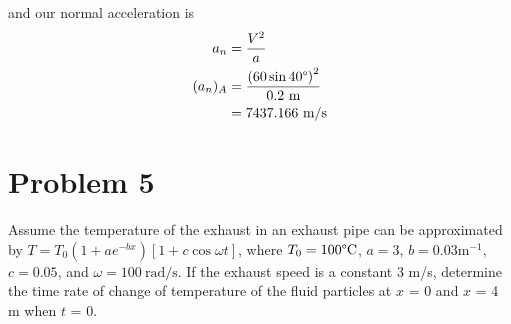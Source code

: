 \documentclass{article}
\begin{document}
and our normal acceleration is
\begin{align*}
    a_n &= \frac{V^2}{a} \\
    (a_n)_A &= \frac{\left(60 \sin{40\degree}\right)^2}{0.2\ \textrm{m}} \\
    &= 7437.166\ \textrm{m/s}
\end{align*}
\newpage

\section*{Problem 5}
Assume the temperature of the exhaust in an exhaust pipe can be approximated by $T = T_0 \left(1 + ae^{-bx}\right)\left[1 + c \cos{\omega t}\right]$, where $T_0 = 100\degree \textrm{C}$, $a = 3$, $b = 0.03 \textrm{m}^{-1}$, $c = 0.05$, and $\omega = 100\ \textrm{rad/s}$. If the exhaust speed is a constant 3 m/s, determine the time rate of change of temperature of the fluid particles at $x$ = 0 and $x$ = 4 m when $t$ = 0.
\end{document}
